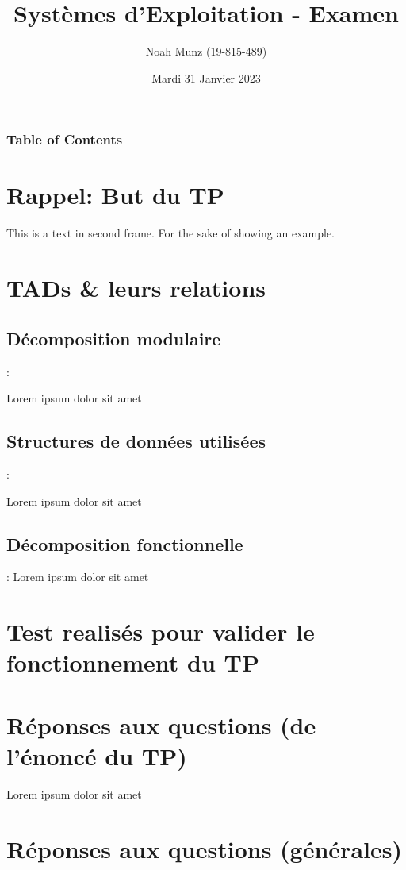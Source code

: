 \documentclass{beamer}
\title[Systèmes d'Exploitation: TP \num]{Systèmes d'Exploitation - Examen}
\subtitle{12X009 - TP\num}
\author[Noah Munz, Sciences Informatiques]{Noah Munz (19-815-489)}
\institute[]{Département d'Informatique \\ Université de Genève}
\date[Examen Oral]{Mardi 31 Janvier 2023}
\newcommand{\sn}{\secname}
\newcommand{\ssn}{\subsecname}
\begin{document}
\frame{\titlepage}

\begin{frame}
\frametitle{Table of Contents}
\tableofcontents
\end{frame}


%
%


%
\section{Rappel: But du TP}
\begin{frame}{\secname \subsecname}
%

This is a text in second frame. For the sake of showing an example.

\end{frame}


%
%
\section{TADs \& leurs relations}
\subsection{Décomposition modulaire}
\begin{frame}{\sn : \ssn}
%

Lorem ipsum dolor sit amet

\end{frame}

%
\subsection{Structures de données utilisées}
\begin{frame}{\sn : \ssn}

Lorem ipsum dolor sit amet
    
\end{frame}
%

%
\subsection{Décomposition fonctionnelle}
\begin{frame}{\sn : \ssn}
    Lorem ipsum dolor sit amet
\end{frame}

%
%
\section{Test realisés pour valider le fonctionnement du TP}
\begin{frame}{\sn}
%

\end{frame}
%
\section{Réponses aux questions (de l'énoncé du TP)}
\begin{frame}{\secname}
%
    Lorem ipsum dolor sit amet

    
\end{frame}

\section{Réponses aux questions (générales)}

\begin{frame}{\secname}
    
\end{frame}
\end{document}
